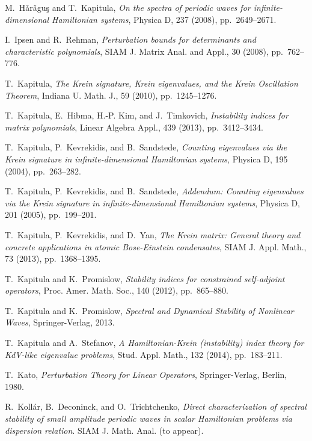 \documentclass[review,onefignum,onetabnum]{siamart171218}
\begin{document}
\begin{thebibliography}{10}
{\sc M.~H\v{a}r\v{a}gu\c{s} and T.~Kapitula}, {\em On the spectra of periodic
  waves for infinite-dimensional {H}amiltonian systems}, Physica D, 237 (2008),
  pp.~2649--2671.

{\sc I.~Ipsen and R.~Rehman}, {\em Perturbation bounds for determinants and
  characteristic polynomials}, {SIAM} J. Matrix Anal. and Appl., 30 (2008),
  pp.~762--776.

{\sc T.~Kapitula}, {\em The {K}rein signature, {K}rein eigenvalues, and the
  {Krein Oscillation Theorem}}, Indiana U. Math. J., 59 (2010), pp.~1245--1276.

{\sc T.~Kapitula, E.~Hibma, H.-P. Kim, and J.~Timkovich}, {\em Instability
  indices for matrix polynomials}, Linear Algebra Appl., 439 (2013),
  pp.~3412--3434.

{\sc T.~Kapitula, P.~Kevrekidis, and B.~Sandstede}, {\em Counting eigenvalues
  via the {K}rein signature in infinite-dimensional {H}amiltonian systems},
  Physica D, 195 (2004), pp.~263--282.

{\sc T.~Kapitula, P.~Kevrekidis, and B.~Sandstede}, {\em Addendum: {C}ounting
  eigenvalues via the {K}rein signature in infinite-dimensional {H}amiltonian
  systems}, Physica D, 201 (2005), pp.~199--201.

{\sc T.~Kapitula, P.~Kevrekidis, and D.~Yan}, {\em The {K}rein matrix:
  {G}eneral theory and concrete applications in atomic {B}ose-{E}instein
  condensates}, SIAM J. Appl. Math., 73 (2013), pp.~1368--1395.

{\sc T.~Kapitula and K.~Promislow}, {\em Stability indices for constrained
  self-adjoint operators}, Proc. Amer. Math. Soc., 140 (2012), pp.~865--880.

{\sc T.~Kapitula and K.~Promislow}, {\em Spectral and Dynamical Stability of
  Nonlinear Waves}, Springer-Verlag, 2013.

{\sc T.~Kapitula and A.~Stefanov}, {\em A {Hamiltonian-Krein} (instability)
  index theory for {KdV}-like eigenvalue problems}, Stud. Appl. Math., 132
  (2014), pp.~183--211.

{\sc T.~Kato}, {\em {Perturbation Theory for Linear Operators}},
  Springer-Verlag, Berlin, 1980.

{\sc R.~Koll\'ar, B.~Deconinck, and O.~Trichtchenko}, {\em Direct
  characterization of spectral stability of small amplitude periodic waves in
  scalar {H}amiltonian problems via dispersion relation}.
\newblock SIAM J. Math. Anal. (to appear).


\end{thebibliography}
\end{document}
